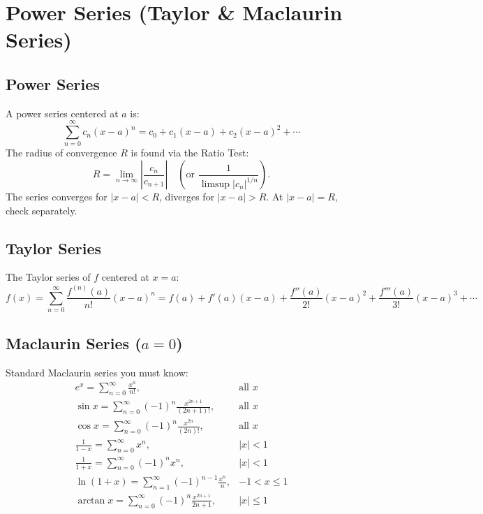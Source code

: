 \documentclass[12pt]{article}
\begin{document}
\section{Power Series (Taylor \& Maclaurin Series)}

\subsection{Power Series}
A power series centered at \(a\) is:
\[
\sum_{n=0}^{\infty} c_n (x-a)^n = c_0 + c_1(x-a) + c_2(x-a)^2 + \cdots
\]
The radius of convergence \(R\) is found via the Ratio Test:
\[
R = \lim_{n\to\infty} \left|\frac{c_n}{c_{n+1}}\right| \quad (\text{or } \frac{1}{\limsup |c_n|^{1/n}}).
\]
The series converges for \(|x-a|<R\), diverges for \(|x-a|>R\). At \(|x-a|=R\), check separately.

\subsection{Taylor Series}
The Taylor series of \(f\) centered at \(x=a\):
\[
f(x) = \sum_{n=0}^{\infty} \frac{f^{(n)}(a)}{n!}(x-a)^n = f(a) + f'(a)(x-a) + \frac{f''(a)}{2!}(x-a)^2 + \frac{f'''(a)}{3!}(x-a)^3 + \cdots
\]

\subsection{Maclaurin Series (\(a=0\))}
Standard Maclaurin series you must know:
\[
\begin{array}{ll}
e^x = \displaystyle\sum_{n=0}^{\infty} \frac{x^n}{n!}, & \text{all } x \\[6pt]
\sin x = \displaystyle\sum_{n=0}^{\infty} (-1)^n \frac{x^{2n+1}}{(2n+1)!}, & \text{all } x \\[6pt]
\cos x = \displaystyle\sum_{n=0}^{\infty} (-1)^n \frac{x^{2n}}{(2n)!}, & \text{all } x \\[6pt]
\frac{1}{1-x} = \displaystyle\sum_{n=0}^{\infty} x^n, & |x|<1 \\[6pt]
\frac{1}{1+x} = \displaystyle\sum_{n=0}^{\infty} (-1)^n x^n, & |x|<1 \\[6pt]
\ln(1+x) = \displaystyle\sum_{n=1}^{\infty} (-1)^{n-1} \frac{x^n}{n}, & -1 < x \le 1 \\[6pt]
\arctan x = \displaystyle\sum_{n=0}^{\infty} (-1)^n \frac{x^{2n+1}}{2n+1}, & |x|\le 1
\end{array}
\]
\end{document}
